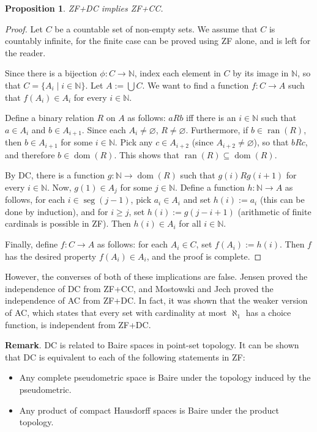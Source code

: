\documentclass[12pt]{article}
\newtheorem{prop}{Proposition}
\newcommand{\dom}[1]{\operatorname{dom}(#1)}
\newcommand{\ran}[1]{\operatorname{ran}(#1)}
\newcommand{\seg}[1]{\operatorname{seg}(#1)}
\begin{document}
\begin{prop} ZF+DC implies ZF+CC. \end{prop}
\begin{proof}  Let $C$ be a countable set of non-empty sets.  We assume that $C$ is countably infinite, for the finite case can be proved using ZF alone, and is left for the reader.

Since there is a bijection $\phi: C\to \mathbb{N}$, index each element in $C$ by its image in $\mathbb{N}$, so that $C=\lbrace A_i\mid i\in \mathbb{N}\rbrace$.  Let $A:=\bigcup C$.  We want to find a function $f:C\to A$ such that $f(A_i)\in A_i$ for every $i\in \mathbb{N}$.

Define a binary relation $R$ on $A$ as follows: $a R b$ iff there is an $i\in \mathbb{N}$ such that $a \in A_i$ and $b\in A_{i+1}$.  Since each $A_i\ne \varnothing$, $R\ne \varnothing$.  Furthermore, if $b\in \ran{R}$, then $b\in A_{i+1}$ for some $i\in \mathbb{N}$.  Pick any $c\in A_{i+2}$ (since $A_{i+2}\ne \varnothing$), so that $b R c$, and therefore $b\in \dom{R}$.  This shows that $\ran{R}\subseteq \dom{R}$.

By DC, there is a function $g:\mathbb{N}\to \dom{R}$ such that $g(i) R g(i+1)$ for every $i\in \mathbb{N}$.  Now, $g(1)\in A_j$ for some $j\in \mathbb{N}$.  Define a function $h:\mathbb{N}\to A$ as follows, for each $i\in \seg{j-1}$, pick $a_i\in A_i$ and set $h(i):=a_i$ (this can be done by induction), and for $i\ge j$, set $h(i):=g(j-i+1)$ (arithmetic of finite cardinals is possible in ZF).  Then $h(i)\in A_i$ for all $i\in \mathbb{N}$.  

Finally, define $f:C\to A$ as follows: for each $A_i\in C$, set $f(A_i):=h(i)$.  Then $f$ has the desired property $f(A_i)\in A_i$, and the proof is complete. \end{proof}

However, the converses of both of these implications are false.  Jensen proved the independence of DC from ZF+CC, and Mostowski and Jech proved the independence of AC from ZF+DC.  In fact, it was shown that the weaker version of AC, which states that every set with cardinality at most $\aleph_1$ has a choice function, is independent from ZF+DC.

\textbf{Remark}.  DC is related to Baire spaces in point-set topology.  It can be shown that DC is equivalent to each of the following statements in ZF:
\begin{itemize}
\item Any complete pseudometric space is Baire under the topology induced by the pseudometric.
\item Any product of compact Hausdorff spaces is Baire under the product topology.
\end{itemize}
\end{document}
